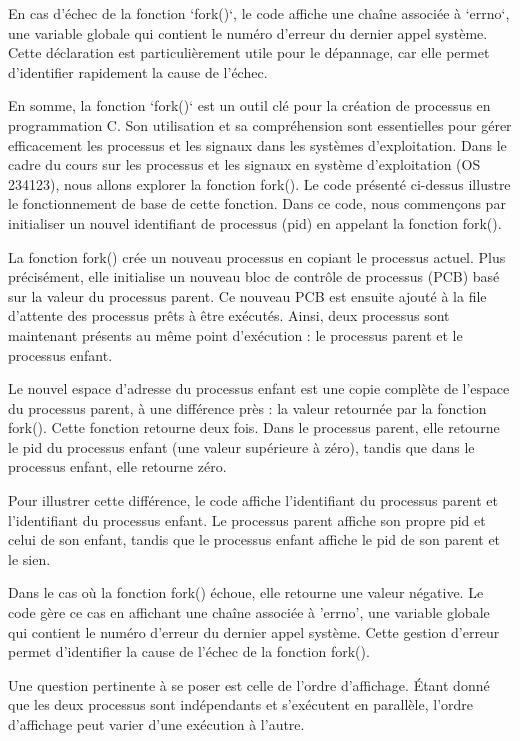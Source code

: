 \documentclass[12pt]{article}
\begin{document}
En cas d'échec de la fonction `fork()`, le code affiche une chaîne associée à `errno`, une variable globale qui contient le numéro d'erreur du dernier appel système. Cette déclaration est particulièrement utile pour le dépannage, car elle permet d'identifier rapidement la cause de l'échec.

En somme, la fonction `fork()` est un outil clé pour la création de processus en programmation C. Son utilisation et sa compréhension sont essentielles pour gérer efficacement les processus et les signaux dans les systèmes d'exploitation.
Dans le cadre du cours sur les processus et les signaux en système d'exploitation (OS 234123), nous allons explorer la fonction fork(). Le code présenté ci-dessus illustre le fonctionnement de base de cette fonction. Dans ce code, nous commençons par initialiser un nouvel identifiant de processus (pid) en appelant la fonction fork(). 

La fonction fork() crée un nouveau processus en copiant le processus actuel. Plus précisément, elle initialise un nouveau bloc de contrôle de processus (PCB) basé sur la valeur du processus parent. Ce nouveau PCB est ensuite ajouté à la file d'attente des processus prêts à être exécutés. Ainsi, deux processus sont maintenant présents au même point d'exécution : le processus parent et le processus enfant.

Le nouvel espace d'adresse du processus enfant est une copie complète de l'espace du processus parent, à une différence près : la valeur retournée par la fonction fork(). Cette fonction retourne deux fois. Dans le processus parent, elle retourne le pid du processus enfant (une valeur supérieure à zéro), tandis que dans le processus enfant, elle retourne zéro.

Pour illustrer cette différence, le code affiche l’identifiant du processus parent et l’identifiant du processus enfant. Le processus parent affiche son propre pid et celui de son enfant, tandis que le processus enfant affiche le pid de son parent et le sien.

Dans le cas où la fonction fork() échoue, elle retourne une valeur négative. Le code gère ce cas en affichant une chaîne associée à 'errno', une variable globale qui contient le numéro d'erreur du dernier appel système. Cette gestion d'erreur permet d'identifier la cause de l'échec de la fonction fork().

Une question pertinente à se poser est celle de l'ordre d'affichage. Étant donné que les deux processus sont indépendants et s'exécutent en parallèle, l'ordre d'affichage peut varier d'une exécution à l'autre.
\end{document}
